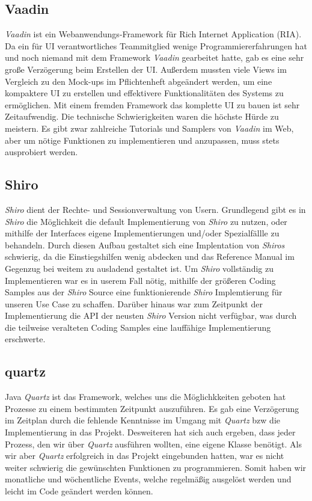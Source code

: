 \subsection{Vaadin} 
\emph{Vaadin} ist ein Webanwendungs-Framework für Rich Internet Application (RIA). Da ein für UI verantwortliches Teammitglied wenige  Programmiererfahrungen hat und noch niemand mit dem Framework \emph{Vaadin} gearbeitet hatte, gab es eine sehr große Verzögerung beim Erstellen der UI. Außerdem mussten viele Views im Vergleich zu den Mock-ups im Pflichtenheft abgeändert werden, um eine kompaktere UI zu erstellen und effektivere Funktionalitäten des Systems zu ermöglichen. Mit einem fremden Framework das komplette UI zu bauen ist sehr Zeitaufwendig. Die technische Schwierigkeiten waren die höchste Hürde zu meistern. Es gibt zwar zahlreiche Tutorials und Samplers von \emph{Vaadin} im Web, aber um nötige Funktionen zu implementieren und anzupassen, muss stets ausprobiert werden.

\subsection{Shiro}
\emph{Shiro} dient der Rechte- und Sessionverwaltung von Usern.
Grundlegend gibt es in \emph{Shiro} die Möglichkeit die default Implementierung von \emph{Shiro} zu nutzen, oder mithilfe der Interfaces
eigene Implementierungen und/oder Spezialfällle zu behandeln.
Durch diesen Aufbau gestaltet sich eine Implentation von \emph{Shiros} schwierig, da die Einstiegshilfen wenig abdecken und das Reference Manual
im Gegenzug bei weitem zu ausladend gestaltet ist. Um \emph{Shiro} vollständig zu Implementieren war es in userem Fall nötig, mithilfe der
größeren Coding Samples aus der \emph{Shiro} Source eine funktionierende \emph{Shiro} Implemtierung für unseren Use Case zu schaffen.
Darüber hinaus war zum Zeitpunkt der Implementierung die API der neusten \emph{Shiro} Version nicht verfügbar, was durch die teilweise veralteten Coding Samples
 eine lauffähige Implementierung erschwerte.
 
\subsection{quartz} 
Java \emph{Quartz} ist das Framework, welches uns die Möglichkkeiten geboten hat Prozesse zu einem bestimmten Zeitpunkt auszuführen. Es gab eine Verzögerung im Zeitplan durch die fehlende Kenntnisse im Umgang mit \emph{Quartz} bzw die Implementierung in das Projekt.
Desweiteren hat sich auch ergeben, dass jeder Prozess, den wir über \emph{Quartz} ausführen wollten, eine eigene Klasse benötigt. Als wir aber \emph{Quartz} erfolgreich in das Projekt eingebunden hatten, war es nicht weiter schwierig die gewünschten Funktionen zu programmieren. Somit haben wir monatliche und wöchentliche Events, welche regelmäßig ausgelöst werden und leicht im Code geändert werden können.

